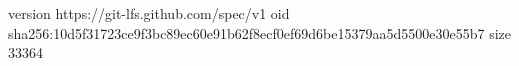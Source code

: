 version https://git-lfs.github.com/spec/v1
oid sha256:10d5f31723ce9f3bc89ec60e91b62f8ecf0ef69d6be15379aa5d5500e30e55b7
size 33364
